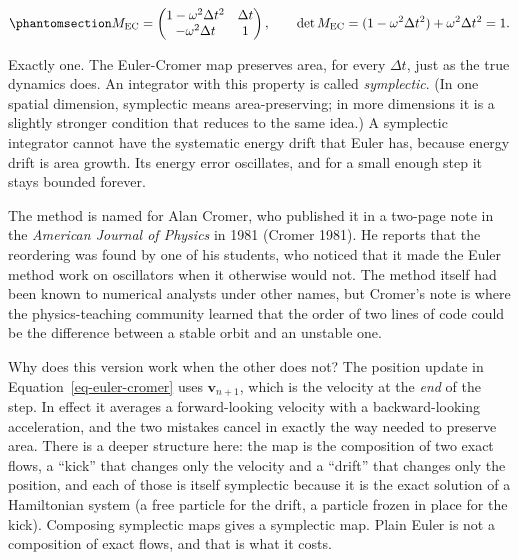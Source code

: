 \documentclass[
  10.5pt,
  letterpaper,
]{scrbook}
\theoremstyle{definition}
\theoremstyle{plain}
\theoremstyle{remark}
\begin{document}
\begin{equation}\protect\phantomsection\label{eq-ec-matrix}{
M_{\mathrm{EC}} = \begin{pmatrix} 1 - \omega^2\Delta t^2 & \Delta t \\ -\omega^2\Delta t & 1 \end{pmatrix},
\qquad \det M_{\mathrm{EC}} = (1 - \omega^2\Delta t^2) + \omega^2\Delta t^2 = 1.
}\end{equation}

Exactly one. The Euler-Cromer map preserves area, for every
\(\Delta t\), just as the true dynamics does. An integrator with this
property is called \emph{symplectic}. (In one spatial dimension,
symplectic means area-preserving; in more dimensions it is a slightly
stronger condition that reduces to the same idea.) A symplectic
integrator cannot have the systematic energy drift that Euler has,
because energy drift is area growth. Its energy error oscillates, and
for a small enough step it stays bounded forever.

\begin{tcolorbox}[enhanced jigsaw, arc=.35mm, bottomrule=.15mm, bottomtitle=1mm, breakable, colback=white, colbacktitle=quarto-callout-note-color!10!white, colframe=quarto-callout-note-color-frame, coltitle=black, left=2mm, leftrule=.75mm, opacityback=0, opacitybacktitle=0.6, rightrule=.15mm, title={Where it comes from}, titlerule=0mm, toprule=.15mm, toptitle=1mm]

The method is named for Alan Cromer, who published it in a two-page note
in the \emph{American Journal of Physics} in 1981 (Cromer 1981). He
reports that the reordering was found by one of his students, who
noticed that it made the Euler method work on oscillators when it
otherwise would not. The method itself had been known to numerical
analysts under other names, but Cromer's note is where the
physics-teaching community learned that the order of two lines of code
could be the difference between a stable orbit and an unstable one.

\end{tcolorbox}

Why does this version work when the other does not? The position update
in Equation~\ref{eq-euler-cromer} uses \(\mathbf{v}_{n+1}\), which is
the velocity at the \emph{end} of the step. In effect it averages a
forward-looking velocity with a backward-looking acceleration, and the
two mistakes cancel in exactly the way needed to preserve area. There is
a deeper structure here: the map is the composition of two exact flows,
a ``kick'' that changes only the velocity and a ``drift'' that changes
only the position, and each of those is itself symplectic because it is
the exact solution of a Hamiltonian system (a free particle for the
drift, a particle frozen in place for the kick). Composing symplectic
maps gives a symplectic map. Plain Euler is not a composition of exact
flows, and that is what it costs.
\end{document}
